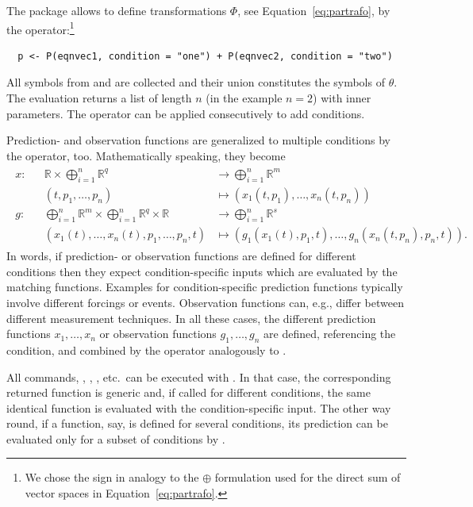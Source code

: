 \documentclass[article]{jss}
\begin{document}
The  package allows to define transformations $\Phi$, see Equation~\ref{eq:partrafo}, by the  operator:\footnote{We chose the  sign in analogy to the $\oplus$ formulation used for the direct sum of vector spaces in Equation~\ref{eq:partrafo}.}
\begin{verbatim}
  p <- P(eqnvec1, condition = "one") + P(eqnvec2, condition = "two")
\end{verbatim}
All symbols from  and  are collected and their union constitutes the symbols of $\theta$. The evaluation  returns a list of length $n$ (in the example $n = 2$) with inner parameters. The  operator can be applied consecutively to add conditions.

Prediction- and observation functions are generalized to multiple conditions by the  operator, too. Mathematically speaking, they become
\begin{align*}
\begin{aligned}
x: &  & \mathbb R \times \bigoplus_{i = 1}^n \mathbb R^q & \longrightarrow  \bigoplus_{i = 1}^n \mathbb R^m \\
 & & (t, p_1, \dots, p_n) & \longmapsto (x_1(t, p_1), \dots, x_n(t, p_n)) \\
g: &  & \bigoplus_{i = 1}^n \mathbb R^m \times \bigoplus_{i = 1}^n \mathbb R^q\times \mathbb R& \longrightarrow  \bigoplus_{i = 1}^n \mathbb R^s \\
& & (x_1(t), \dots, x_n(t), p_1, \dots, p_n, t) & \longmapsto (g_1(x_1(t), p_1, t), \dots, g_n(x_n(t, p_n), p_n, t)).
\end{aligned}
\label{}
\end{align*}
In words, if prediction- or observation functions are defined for different conditions then they expect condition-specific inputs which are evaluated by the matching functions. Examples for condition-specific prediction functions typically involve different forcings or events. Observation functions can, e.g., differ between different measurement techniques. In all these cases, the different prediction functions $x_1, \dots, x_n$ or observation functions $g_1, \dots, g_n$ are defined, referencing the condition, and combined by the  operator analogously to .

All commands, , , , etc.~can be executed with . In that case, the corresponding returned function is generic and, if called for different conditions, the same identical function is evaluated with the condition-specific input. The other way round, if a function, say,  is defined for several conditions, its prediction can be evaluated only for a subset of conditions by .
\end{document}
